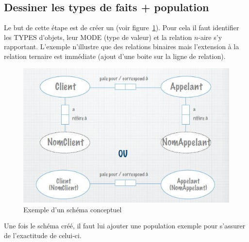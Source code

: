 \subsection{Dessiner les types de faits + population}
Le but de cette étape est de créer un 
(voir figure~\ref{schema_conceptuel}).
Pour cela il faut identifier les TYPES d'objets,
leur MODE (type de valeur)
et la relation $n$-aire s'y rapportant.
L'exemple n'illustre que des relations binaires mais l'extension
à la relation ternaire est immédiate
(ajout d'une boite sur la ligne de relation).
\begin{figure}[h]
  \centering
  \includegraphics[scale=0.7]{schema_conceptuel.jpg}
  \caption{Exemple d'un schéma conceptuel}
  \label{schema_conceptuel}
\end{figure}
Une fois le schéma créé,
il faut lui ajouter une population exemple pour
s'assurer de l'exactitude de celui-ci.

